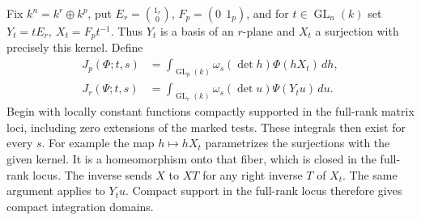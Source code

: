 \documentclass[a4paper,11pt]{article}
\theoremstyle{definition}
\theoremstyle{remark}
\numberwithin{equation}{section}
\begin{document}
Fix \(k^n=k^r\oplus k^p\), put \(E_r=\binom{1_r}{0}\),
\(F_p=(0\ \ 1_p)\), and for \(t\in\operatorname{GL}_n(k)\) set
\(Y_t=tE_r,\ X_t=F_p t^{-1}\). Thus \(Y_t\) is a basis of an
\(r\)-plane and \(X_t\) a surjection with precisely this
kernel. Define
\[
 \begin{split}
 J_p(\Phi;t,s)&=\int_{\operatorname{GL}_p(k)}
          \omega_s(\det h)\Phi(hX_t)\,dh,\\
 J_r(\Psi;t,s)&=\int_{\operatorname{GL}_r(k)}
          \omega_s(\det u)\Psi(Y_tu)\,du .
 \end{split}
\]
Begin with locally constant functions compactly supported in
the full-rank matrix loci, including zero extensions of
the marked tests. These integrals then exist for every \(s\).
For example the map \(h\mapsto hX_t\) parametrizes the
surjections with the given kernel. It is a homeomorphism
onto that fiber, which is closed in the full-rank locus.
The inverse sends \(X\) to \(XT\) for any right inverse \(T\)
of \(X_t\). The same argument applies to \(Y_tu\).
Compact support in the full-rank locus therefore gives
compact integration domains.
\end{document}
